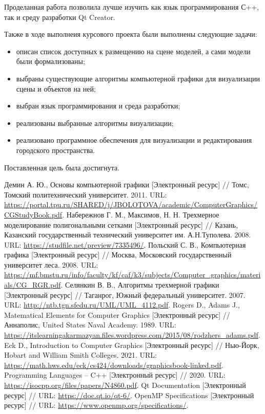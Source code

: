 \documentclass[a4paper,14pt, unknownkeysallowed]{extreport}
\begin{document}
Проделанная работа позволила лучше изучить как язык программирования С++, так и среду разработки Qt Creator.

Также в ходе выполнеия курсового проекта были выполнены следующие задачи:

\begin{itemize}
	\item описан список доступных к размещению на сцене моделей, а сами модели были  формализованы;
	\item выбраны существующие алгоритмы компьютерной графики для визуализации сцены и объектов на ней;
	\item выбран язык программирования и среда разработки;
	\item реализованы выбранные алгоритмы визуализации;
	\item реализовано программное обеспечения для визуализации и редактирования городского пространства.
\end{itemize}

Поставленная цель была достигнута.

\begin{thebibliography}{9}
	Демин А. Ю., Основы компьютерной графики [Электронный ресурс] // Томс, Томский политехнический университет. 2011. URL: \url{https://portal.tpu.ru/SHARED/j/JBOLOTOVA/academic/ComputerGraphics/CGStudyBook.pdf}.
	Набережнов Г. М., Максимов, Н. Н. Трехмерное моделирование полигональными сетками [Электронный ресурс] // Казань, Казанский государственный технический университет им. А.Н.Туполева. 2008. URL: \url{https://studfile.net/preview/7335496/}.
	Польский С. В., Компьютерная графика [Электронный ресурс] // Москва, Московский государственный университет леса. 2008. URL: \url{https://mf.bmstu.ru/info/faculty/kf/caf/k3/subjects/Computer_graphics/materials/CG_RGR.pdf}.
	Селянкин В. В., Алгоритмы трехмерной графики [Электронный ресурс] // Таганрог, Южный федеральный университет. 2007. URL: \url{http://ntb.tgn.sfedu.ru/UML/UML_4112.pdf}.
	Rogers D., Adams J., Matematical Elements for Computer Graphics [Электронный ресурс] // Аннаполис, United States Naval Academy. 1989. URL: \url{https://itslearningakarmazyan.files.wordpress.com/2015/08/rodzhers_adams.pdf}.
	 Eck D., Introduction to Computer Graphics [Электронный ресурс] // Нью-Йорк, Hobart and William Smith Colleges. 2021. URL: \url{https://math.hws.edu/eck/cs424/downloads/graphicsbook-linked.pdf}.
	Programming Languages -- C++ [Электронный ресурс] // 2020. URL: \url{https://isocpp.org/files/papers/N4860.pdf}.
	Qt Documentation [Электронный ресурс] // URL: \url{https://doc.qt.io/qt-6/}.
	OpenMP Specifications [Электронный ресурс] // URL: \url{https://www.openmp.org/specifications/}.
\end{thebibliography}

\end{document}
